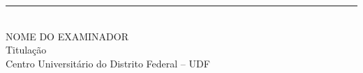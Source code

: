 \begin{folhadeaprovacao}
\begin{center}
\vspace{1.15cm}

\begin{minipage}{8.5cm}
\centering
\rule{\linewidth}{0.4pt}\\[-0.05cm]
{\small NOME DO EXAMINADOR}\\[-0.05cm]
{\small Titulação}\\[-0.05cm]
{\small Centro Universitário do Distrito Federal -- UDF}
\end{minipage}

\vspace{0.9cm}

\begin{flushleft}
\end{flushleft}

\end{center}
\end{folhadeaprovacao}
